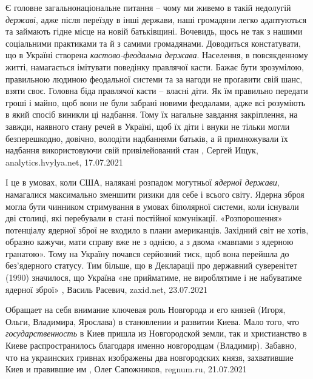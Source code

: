 Є головне загальнонаціональне питання – чому ми живемо в такій недолугій
\emph{державі}, адже після переїзду в інші держави, наші громадяни легко
адаптуються та займають гідне місце на новій батьківщині. Вочевидь, щось не так
з нашими соціальними практиками та й з самими громадянами.  Доводиться
констатувати, що в Україні створена \emph{кастово-феодальна держава}.
Населення, в повсякденному житті, намагається імітувати поведінку правлячої
касти. Бажає бути зрозумілою, правильною людиною феодальної системи та за
нагоди не проґавити свій шанс, взяти своє.  Головна біда правлячої касти –
власні діти. Як їм правильно передати гроші і майно, щоб вони не були забрані
новими феодалами, адже всі розуміють в який спосіб виникли ці надбання. Тому їх
нагальне завдання закріплення, на завжди, наявного стану речей в Україні, щоб
їх діти і внуки не тільки могли безперешкодно, довічно, володіти надбаннями
батьків, а й примножували їх надбання використовуючи свій привілейований стан
, 
Сергей Ищук, analytics.hvylya.net, 17.07.2021

І це в умовах, коли США, налякані розпадом могутньої \emph{ядерної держави},
намагалися максимально зменшити ризики для себе і всього світу. Ядерна зброя
могла бути чинником стримування в умовах біполярної системи, коли існували дві
столиці, які перебували в стані постійної комунікації. «Розпорошення»
потенціалу ядерної зброї не входило в плани американців. Західний світ не
хотів, образно кажучи, мати справу вже не з однією, а з двома «мавпами з
ядерною гранатою». Тому на Україну почався серйозний тиск, щоб вона перейшла до
без’ядерного статусу. Тим більше, що в Декларації про державний суверенітет
(1990) значилося, що Україна «не прийматиме, не вироблятиме і не набуватиме
ядерної зброї»
, 
Василь Расевич, zaxid.net, 23.07.2021

Обращает на себя внимание ключевая роль Новгорода и его князей (Игоря, Ольги,
Владимира, Ярослава) в становлении и развитии Киева.  Мало того, что
\emph{государственность} в Киев пришла из Новгородской земли, так и христианство в
Киеве распространилось благодаря именно новгородцам (Владимир).  Забавно, что
на украинских гривнах изображены два новгородских князя, захватившие Киев и
правившие им
, 
Олег Сапожников, regnum.ru, 21.07.2021


